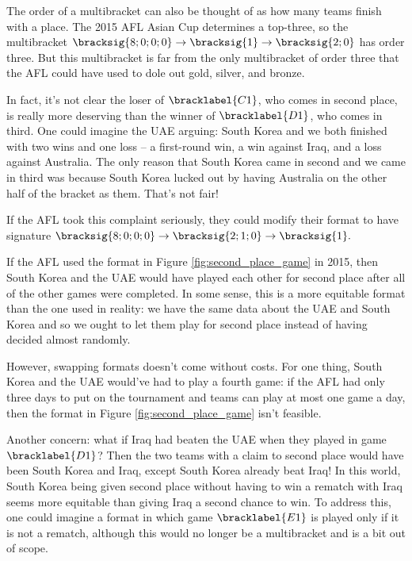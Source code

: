 {    The order of a multibracket can also be thought of as how many teams finish with a place. The 2015 AFL Asian Cup determines a top-three, so the multibracket $\bracksig{8;0;0;0} \to \bracksig{1} \to \bracksig{2;0}$ has order three.  
    But this multibracket is far from the only multibracket of order three that the AFL could have used to dole out gold, silver, and bronze.
    
    In fact, it's not clear the loser of $\bracklabel{C1}$, who comes in second place, is really more deserving than the winner of $\bracklabel{D1}$, who comes in third. One could imagine the UAE arguing: South Korea and we both finished with two wins and one loss -- a first-round win, a win against Iraq, and a loss against Australia. The only reason that South Korea came in second and we came in third was because South Korea lucked out by having Australia on the other half of the bracket as them. That's not fair!

    If the AFL took this complaint seriously, they could modify their format to have signature $\bracksig{8;0;0;0} \to \bracksig{2; 1; 0} \to \bracksig{1}.$
    

    If the AFL used the format in Figure \ref{fig:second_place_game} in 2015, then South Korea and the UAE would have played each other for second place after all of the other games were completed. In some sense, this is a more equitable format than the one used in reality: we have the same data about the UAE and South Korea and so we ought to let them play for second place instead of having decided almost randomly.

    However, swapping formats doesn't come without costs. For one thing, South Korea and the UAE would've had to play a fourth game: if the AFL had only three days to put on the tournament and teams can play at most one game a day, then the format in Figure \ref{fig:second_place_game} isn't feasible.

    Another concern: what if Iraq had beaten the UAE when they played in game $\bracklabel{D1}$? Then the two teams with a claim to second place would have been South Korea and Iraq, except South Korea already beat Iraq! In this world, South Korea being given second place without having to win a rematch with Iraq seems more equitable than giving Iraq a second chance to win. To address this, one could imagine a format in which game $\bracklabel{E1}$ is played only if it is not a rematch, although this would no longer be a multibracket and is a bit out of scope.

}
